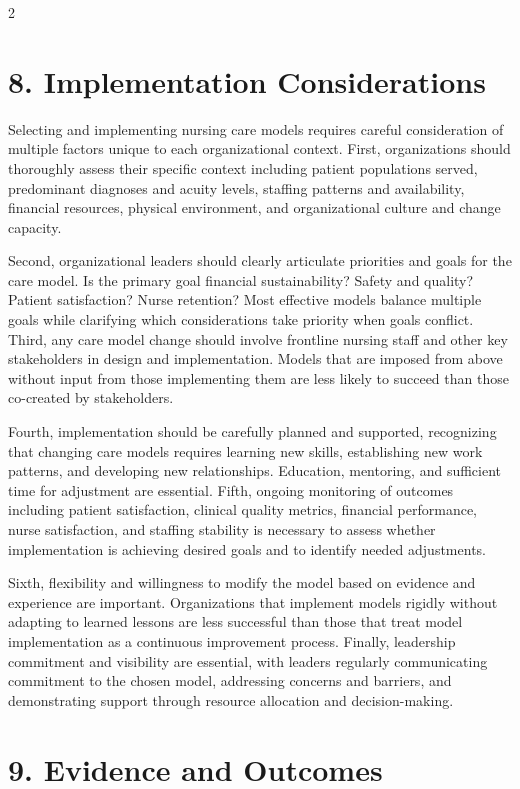\documentclass[12pt]{article}
\begin{document}
\begin{multicols}{2}
\section*{8. \quad Implementation Considerations}

Selecting and implementing nursing care models requires careful consideration of multiple factors unique to each organizational context. First, organizations should thoroughly assess their specific context including patient populations served, predominant diagnoses and acuity levels, staffing patterns and availability, financial resources, physical environment, and organizational culture and change capacity.

Second, organizational leaders should clearly articulate priorities and goals for the care model. Is the primary goal financial sustainability? Safety and quality? Patient satisfaction? Nurse retention? Most effective models balance multiple goals while clarifying which considerations take priority when goals conflict. Third, any care model change should involve frontline nursing staff and other key stakeholders in design and implementation. Models that are imposed from above without input from those implementing them are less likely to succeed than those co-created by stakeholders.

Fourth, implementation should be carefully planned and supported, recognizing that changing care models requires learning new skills, establishing new work patterns, and developing new relationships. Education, mentoring, and sufficient time for adjustment are essential. Fifth, ongoing monitoring of outcomes including patient satisfaction, clinical quality metrics, financial performance, nurse satisfaction, and staffing stability is necessary to assess whether implementation is achieving desired goals and to identify needed adjustments.

Sixth, flexibility and willingness to modify the model based on evidence and experience are important. Organizations that implement models rigidly without adapting to learned lessons are less successful than those that treat model implementation as a continuous improvement process. Finally, leadership commitment and visibility are essential, with leaders regularly communicating commitment to the chosen model, addressing concerns and barriers, and demonstrating support through resource allocation and decision-making.

\section*{9. \quad Evidence and Outcomes}


\end{multicols}
\end{document}
